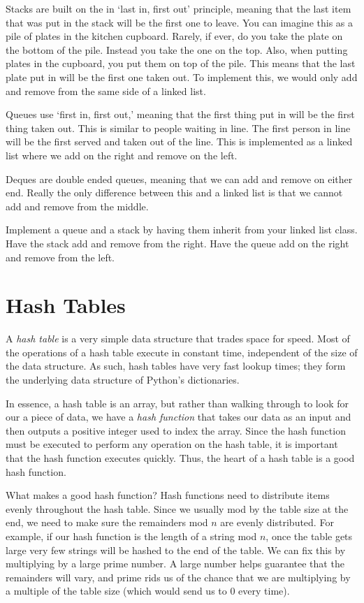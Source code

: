 Stacks are built on the in `last in, first out' principle, meaning that the last item that was put in the stack will be the first one to leave. You can imagine this as a pile of plates in the kitchen cupboard. Rarely, if ever, do you take the plate on the bottom of the pile. Instead you take the one on the top. Also, when putting plates in the cupboard, you put them on top of the pile. This means that the last plate put in will be the first one taken out. To implement this, we would only add and remove from the same side of a linked list.

Queues use `first in, first out,' meaning that the first thing put in will be the first thing taken out. This is similar to people waiting in line. The first person in line will be the first served and taken out of the line. This is implemented as a linked list where we add on the right and remove on the left.

Deques are double ended queues, meaning that we can add and remove on either end. Really the only difference between this and a linked list is that we cannot add and remove from the middle.

\begin{problem}
Implement a queue and a stack by having them inherit from your linked list class.
Have the stack add and remove from the right.
Have the queue add on the right and remove from the left.
\label{prob:Stack}
\end{problem}

\section*{Hash Tables}
A \emph{hash table} is a very simple data structure that trades space for speed.
Most of the operations of a hash table execute in constant time, independent of the size of the data structure.
As such, hash tables have very fast lookup times;  they form the underlying data structure of Python's dictionaries.

In essence, a hash table is an array, but rather than walking through to look for our a piece of data, we have a \emph{hash function} that takes our data as an input and then outputs a positive integer used to index the array.
Since the hash function must be executed to perform any operation on the hash table, it is important that the hash function executes quickly.
Thus, the heart of a hash table is a good hash function.

What makes a good hash function?
Hash functions need to distribute items evenly throughout the hash table.
Since we usually mod by the table size at the end, we need to make sure the remainders mod $n$ are evenly distributed.
For example, if our hash function is the length of a string mod $n$, once the table gets large very few strings will be hashed to the end of the table.
We can fix this by multiplying by a large prime number.
A large number helps guarantee that the remainders will vary, and prime rids us of the chance that we are multiplying by a multiple of the table size (which would send us to 0 every time). 

